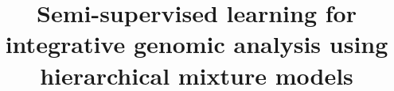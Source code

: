 \documentclass{bmcart}
\begin{document}
\begin{frontmatter}

\begin{fmbox}


\title{Semi-supervised learning for integrative genomic analysis using hierarchical mixture models}


\author[
   addressref={aff1},                   %
   email={daniel.dvorkin@ucdenver.edu}   %
]{ }
\author[
   addressref={aff1},                   %
   email={rani.powers@ucdenver.edu}   %
]{ }
\author[
   addressref={aff2},                   %
   email={michael.daniels@ucdenver.edu}   %
]{ }
\author[
   addressref={aff2},                   %
   email={katerina.kechris@ucdenver.edu}   %
]{ }


\address[id=aff1]{%
  , %
  ,                     %
  ,                              %
}
\address[id=aff2]{%
  ,
  ,
}


\end{fmbox}
\end{frontmatter}
\end{document}
